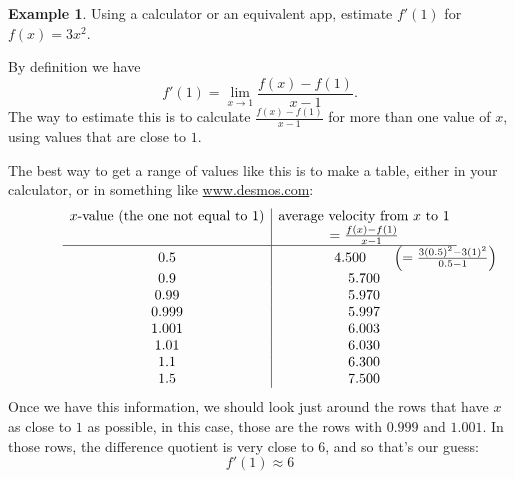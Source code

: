 \documentclass[oneside]{book}
\theoremstyle{definition}
\newtheorem{example}{Example}
\theoremstyle{solution}
\newtheorem*{solution}{Solution}
\newenvironment{solution}{\vspace{2in}\comment}{\endcomment}
\begin{document}
\begin{example}
Using a calculator or an equivalent app, estimate $f'(1)$ for $f(x) =
3x^2$.  
\end{example}

\begin{solution}
By definition we have
$$
 f'(1) = \lim_{x \to 1}\frac{f(x) - f(1)}{x-1} .
$$
The way to estimate this is to calculate $\frac{f(x)-f(1)}{x-1}$ for
more than one value of $x$, using values that are close to $1$.  

The best way to get a range of values like this is to make a table,
either in your calculator, or in something like \url{www.desmos.com}:  
$$
\begin{array}{c|c}
\text{$x$-value (the one not equal to $1$)} 
      & \text{average velocity from $x$ to $1$}                            \\
      & = \frac{f(x)-f(1)}{x-1}                                            \\ \hline
  0.5 & 4.500  \qquad \rlap{$\left(=\frac{3(0.5)^2-3(1)^2}{0.5-1}\right)$} \\
0.9   & 5.700                                                              \\
0.99  & 5.970                                                              \\
0.999 & 5.997                                                              \\
1.001 & 6.003                                                              \\
1.01  & 6.030                                                              \\
1.1   & 6.300                                                              \\
1.5   & 7.500 
\end{array}
$$
Once we have this information, we should look just around the rows
that have $x$ as close to $1$ as possible, in this case, those are the
rows with $0.999$ and $1.001$.  In those rows, the difference quotient
is very close to $6$, and so that's our guess:
$$
f'(1) \approx 6
$$
\end{solution}
\end{document}
